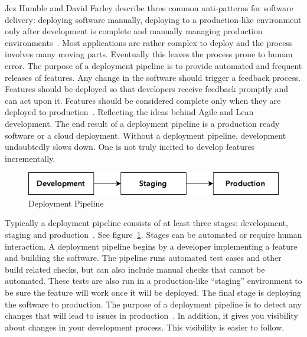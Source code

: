 \documentclass[english]{tktltiki2}
\begin{document}
Jez Humble and David Farley describe three common anti-patterns for software delivery: deploying software manually, deploying to a production-like environment only after development is complete and manually managing production environments~\cite{HF11}. Most applications are rather complex to deploy and the process involves many moving parts. Eventually this leaves the process prone to human error. The purpose of a deployment pipeline is to provide automated and frequent releases of features. Any change in the software should trigger a feedback process. Features should be deployed so that developers receive feedback promptly and can act upon it. Features should be considered complete only when they are deployed to production~\cite{HF11}. Reflecting the ideas behind Agile and Lean development. The end result of a deployment pipeline is a production ready software or a cloud deployment. Without a deployment pipeline, development undoubtedly slows down. One is not truly incited to develop features incrementally.

\begin{figure}[h!]

    \vspace{1cm}
    \centering

    \includegraphics{figures/deployment-pipeline}

    \caption{Deployment Pipeline}
    \label{figure:deployment-pipeline}

    \vspace{1cm}

\end{figure}

Typically a deployment pipeline consists of at least three stages: development, staging and production~\cite{HF11}. See figure~\ref{figure:deployment-pipeline}. Stages can be automated or require human interaction. A deployment pipeline begins by a developer implementing a feature and building the software. The pipeline runs automated test cases and other build related checks, but can also include manual checks that cannot be automated. These tests are also run in a production-like “staging” environment to be sure the feature will work once it will be deployed. The final stage is deploying the software to production. The purpose of a deployment pipeline is to detect any changes that will lead to issues in production~\cite{Fow13b}. In addition, it gives you visibility about changes in your development process. This visibility is easier to follow.
\end{document}
